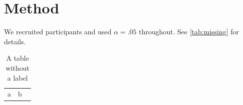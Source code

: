 \section{Method}
We recruited participants and used $\alpha = .05$ throughout.
See \cref{tab:missing} for details.
\begin{table}
  \caption{A table without a label}
  \begin{tabular}{ll}
    a & b \
  \end{tabular}
\end{table}
